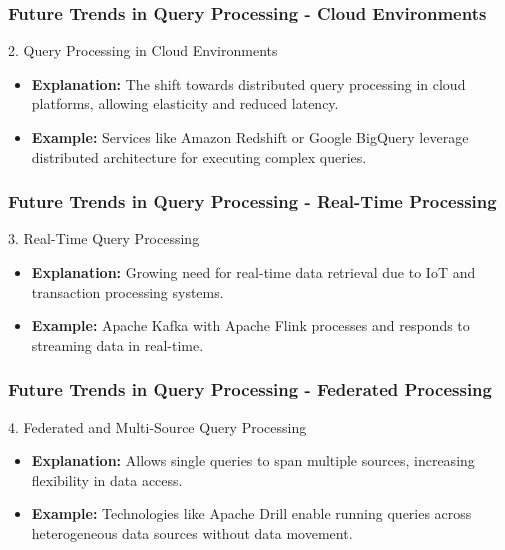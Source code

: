 \documentclass[aspectratio=169]{beamer}
\begin{document}
\begin{frame}[fragile]
    \frametitle{Future Trends in Query Processing - Cloud Environments}
    \begin{block}{2. Query Processing in Cloud Environments}
        \begin{itemize}
            \item \textbf{Explanation:} The shift towards distributed query processing in cloud platforms, allowing elasticity and reduced latency.
            \item \textbf{Example:}
                Services like Amazon Redshift or Google BigQuery leverage distributed architecture for executing complex queries.
        \end{itemize}
    \end{block}
\end{frame}

\begin{frame}[fragile]
    \frametitle{Future Trends in Query Processing - Real-Time Processing}
    \begin{block}{3. Real-Time Query Processing}
        \begin{itemize}
            \item \textbf{Explanation:} Growing need for real-time data retrieval due to IoT and transaction processing systems.
            \item \textbf{Example:} 
                Apache Kafka with Apache Flink processes and responds to streaming data in real-time.
        \end{itemize}
    \end{block}
\end{frame}

\begin{frame}[fragile]
    \frametitle{Future Trends in Query Processing - Federated Processing}
    \begin{block}{4. Federated and Multi-Source Query Processing}
        \begin{itemize}
            \item \textbf{Explanation:} Allows single queries to span multiple sources, increasing flexibility in data access.
            \item \textbf{Example:}
                Technologies like Apache Drill enable running queries across heterogeneous data sources without data movement.
        \end{itemize}
    \end{block}
\end{frame}
\end{document}
